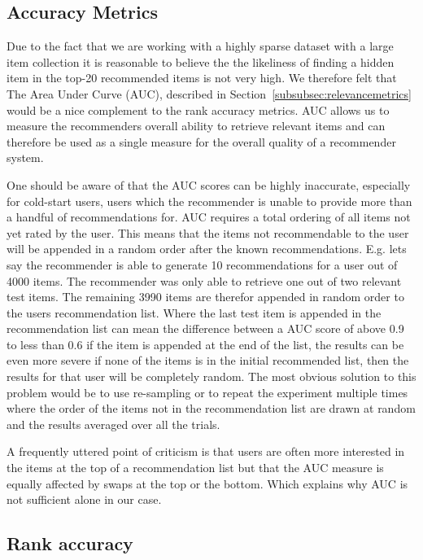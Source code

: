 \subsection{Accuracy Metrics}

Due to the fact that we are working with a highly sparse dataset with a large item collection
it is reasonable to believe the the likeliness of finding a hidden item in the top-20 recommended items
is not very high. We therefore felt that The Area Under Curve (AUC), described in Section~\ref{subsubsec:relevancemetrics}
would be a nice complement to the rank accuracy metrics. AUC allows us to measure the recommenders overall
ability to retrieve relevant items and can therefore be used as a single measure for the overall quality of a recommender
system.

One should be aware of that the AUC scores can be highly inaccurate, especially for cold-start users,
users which the recommender is unable to provide more than a handful of recommendations for. AUC requires
a total ordering of all items not yet rated by the user. This means that the items not recommendable
to the user will be appended in a random order after the known recommendations.
E.g. lets say the recommender is able to generate 10 recommendations for a user out of 4000 items.
The recommender was only able to retrieve one out of two relevant test items. The remaining 3990
items are therefor appended in random order to the users recommendation list. Where the last test item is
appended in the recommendation list can mean the difference between a AUC score of above
0.9 to less than 0.6 if the item is appended at the end of the list, the results can be even more
severe if none of the items is in the initial recommended list, then the results for that user will be
completely random. The most obvious solution to this problem would be to use re-sampling or to repeat
the experiment multiple times where the order of the items not in the recommendation list are drawn at random and
the results averaged over all the trials.

A frequently uttered point of criticism is that users are often more interested in the items
at the top of a recommendation list but that the AUC measure is equally affected by swaps at the top
or the bottom. Which explains why AUC is not sufficient alone in our case.

\subsection{Rank accuracy}

